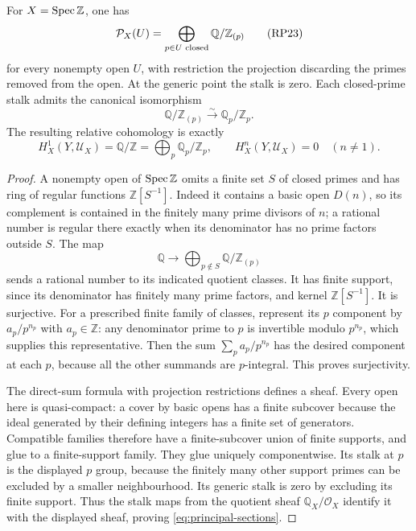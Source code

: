 \begin{theorem}
\label{thm:integer-receiver}
For $X=\operatorname{Spec}\mathbb Z$, one has
\[
 \mathcal P_X(U)=\bigoplus_{p\in U\text{ closed}}\mathbb Q/\mathbb Z_{(p)}
 \tag{RP23}\label{eq:principal-sections}
\]
for every nonempty open $U$, with restriction the projection discarding
the primes removed from the open. At the generic point the stalk is
zero. Each closed-prime stalk admits the canonical isomorphism
\[
 \mathbb Q/\mathbb Z_{(p)}\xrightarrow{\sim}\mathbb Q_p/\mathbb Z_p.
 \tag{RP24}\label{eq:completion-quotient}
\]
The resulting relative cohomology is exactly
\[
 H_X^1(Y,\mathcal U_X)=\mathbb Q/\mathbb Z
  =\bigoplus_p\mathbb Q_p/\mathbb Z_p,
 \qquad H_X^n(Y,\mathcal U_X)=0\quad(n\ne1).
 \tag{RP25}\label{eq:integer-relative}
\]
\end{theorem}
\begin{proof}
A nonempty open of $\operatorname{Spec}\mathbb Z$ omits a finite set $S$ of closed
primes and has ring of regular functions $\mathbb Z[S^{-1}]$.
Indeed it contains a basic open $D(n)$, so its complement is contained
in the finitely many prime divisors of $n$; a rational number is regular
there exactly when its denominator has no prime factors outside $S$.
The map
\[
 \mathbb Q\longrightarrow\bigoplus_{p\notin S}
                    \mathbb Q/\mathbb Z_{(p)}
 \tag{RP26}\label{eq:rational-principal-map}
\]
sends a rational number to its indicated quotient classes. It has
finite support, since its denominator has finitely many prime factors,
and kernel $\mathbb Z[S^{-1}]$. It is surjective. For a prescribed
finite family of classes, represent its $p$ component by $a_p/p^{n_p}$
with $a_p\in\mathbb Z$: any denominator prime to $p$ is invertible
modulo $p^{n_p}$, which supplies this representative. Then the sum
$\sum_p a_p/p^{n_p}$ has the desired component at each $p$, because
all the other summands are $p$-integral. This proves surjectivity.

The direct-sum formula with projection restrictions defines a sheaf.
Every open here is quasi-compact: a cover by basic opens has a finite
subcover because the ideal generated by their defining integers has
a finite set of generators. Compatible families therefore have a
finite-subcover union of finite supports, and glue to a finite-support
family. They glue uniquely componentwise. Its stalk at $p$ is the
displayed $p$ group, because the finitely many other support primes
can be excluded by a smaller neighbourhood. Its generic stalk is zero
by excluding its finite support. Thus the stalk maps from the quotient
sheaf $\mathbb Q_X/\mathcal O_X$ identify it with the displayed sheaf,
proving \eqref{eq:principal-sections}.


\end{proof}
